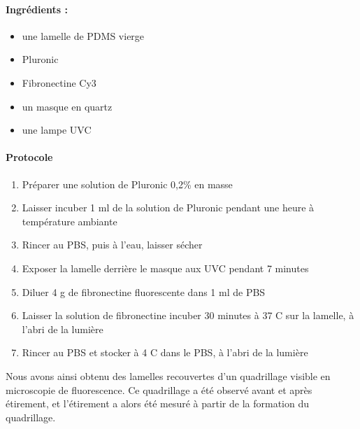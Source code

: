 	\paragraph{Ingrédients : }
	\begin{itemize}
	\item une lamelle de PDMS vierge
	\item Pluronic
	\item Fibronectine Cy3
	\item un masque en quartz 
	\item une lampe UVC
	\end{itemize}
	
	\paragraph{Protocole}
	\begin{enumerate}
	\item Préparer une solution de Pluronic 0,2\% en masse
	\item Laisser incuber 1 ml de la solution de Pluronic pendant une heure à température ambiante
	\item Rincer au PBS, puis à l'eau, laisser sécher
	\item Exposer la lamelle derrière le masque aux UVC pendant 7 minutes
	\item Diluer 4 \micro g de fibronectine fluorescente dans 1 ml de PBS
	\item Laisser la solution de fibronectine incuber 30 minutes à 37 \degres C sur la lamelle, à l'abri de la lumière
	\item Rincer au PBS et stocker à 4 \degres C dans le PBS, à l'abri de la lumière
\end{enumerate}		
	
	Nous avons ainsi obtenu des lamelles recouvertes d'un quadrillage visible en microscopie de fluorescence. Ce quadrillage a été observé avant et après étirement, et l'étirement a alors été mesuré à partir de la formation du quadrillage.
	
	

